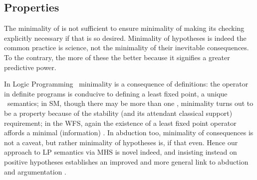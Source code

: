 \documentclass{llncs}
\begin{document}
			
		\subsection{Properties}
			The minimality of  is not sufficient to ensure minimality of  making its checking explicitly necessary
			if that is so desired.
			Minimality of hypotheses is indeed the common practice is science, not the minimality of their inevitable consequences.
			To the contrary, the more of these the better because it signifies a greater predictive power.
	
			In Logic Programming \m{}inimality is a consequence of definitions: the  operator in definite programs is conducive to
			defining a
			least fixed point, a unique \mm\ semantics; in SM, though there may be more than one \m, minimality turns out to be a property because
			of the stability (and its attendant classical support) requirement; in the WFS, again the existence of a least fixed point operator affords a
			minimal (information) \m.
			In abduction too, minimality of consequences is not a caveat, but rather minimality of hypotheses is, if that even.
			Hence our approach to LP semantics via MHS is novel indeed, and insisting instead on positive hypotheses establishes an improved and
			more general link to abduction and argumentation \cite{Pereira:2007fv,lmp:arg07}.
\end{document}
